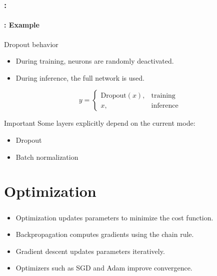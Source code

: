 \documentclass[xcolor=table]{beamer}
\begin{document}
\begin{frame}
	\frametitle{\insertshortsubtitle: \insertsection}
	\framesubtitle{\insertsubsection: Example}
	
	\begin{block}{Dropout behavior}
		\begin{itemize}
			\item During training, neurons are randomly deactivated.
			\item During inference, the full network is used.
		\end{itemize}
	\end{block}
	
	\vspace{0.3cm}
	
	\begin{equation*}
		y =
		\begin{cases}
			\text{Dropout}(x), & \text{training} \\
			x, & \text{inference}
		\end{cases}
	\end{equation*}
	
	\vspace{0.3cm}
	
	\begin{alertblock}{Important}
		Some layers explicitly depend on the current mode:
		\begin{itemize}
			\item Dropout
			\item Batch normalization
		\end{itemize}
	\end{alertblock}
	
\end{frame}

\section{Optimization}

\begin{frame}
	\frametitle{\insertshortsubtitle}
	\framesubtitle{\insertsection}
	
	\begin{itemize}
		\item Optimization updates parameters to minimize the cost function.
		
		\item Backpropagation computes gradients using the chain rule.
		
		\item Gradient descent updates parameters iteratively.
		
		\item Optimizers such as SGD and Adam improve convergence.
	\end{itemize}
	
\end{frame}
\end{document}
